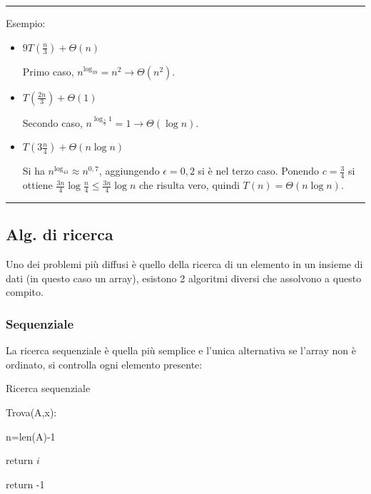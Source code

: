 \documentclass{article}
\begin{document}
\newpage

\noindent\rule{\textwidth}{0.5pt}\newline

\noindent Esempio:
\begin{itemize}
    \item $9T(\frac{n}{3})+\Theta(n)$

    Primo caso, $n^{\log_39}=n^2\rightarrow\Theta(n^2)$.

    \item $T(\frac{2n}{3})+\Theta(1)$

    Secondo caso, $n^{\log_{\frac{3}{2}}1}=1\rightarrow\Theta(\log n)$.

    \item $T(3\frac{n}{4})+\Theta(n\log n)$

    Si ha $n^{\log_43}\approx n^{0,7}$, aggiungendo $\epsilon=0,2$ si è nel terzo caso. Ponendo $c=\frac{3}{4}$ si ottiene $\frac{3n}{4}\log \frac{n}{4}\leq \frac{3n}{4}\log n$ che risulta vero, quindi $T(n)=\Theta(n\log n)$.
    
\end{itemize}

\noindent\rule{\textwidth}{0.5pt}\newline

\subsection{Alg. di ricerca}

Uno dei problemi più diffusi è quello della ricerca di un elemento in un insieme di dati (in questo caso un array), esistono 2 algoritmi diversi che assolvono a questo compito. 

\subsubsection{Sequenziale}

La ricerca sequenziale è quella più semplice e l'unica alternativa se l'array non è ordinato, si controlla ogni elemento presente: 

\begin{algorithm}[ht]
\caption{Ricerca sequenziale}
\begin{algorithmic}
\State Trova(A,x):

    \State n=len(A)-1 

     

         

            \State return $i$

        \EndIf
    \EndFor

\State return -1 

\end{algorithmic}
\end{algorithm}
\end{document}
